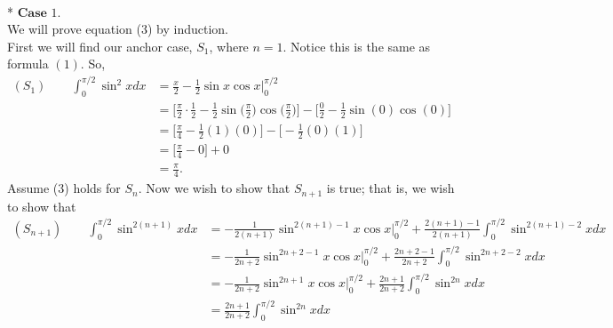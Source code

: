 \documentclass[10pt]{article}
\makeatletter
\newenvironment{question}[2][Question]{\begin{trivlist}
\item[\hskip \labelsep {\bfseries #1}\hskip \labelsep {\bfseries #2.}]}{\end{trivlist}}
\renewenvironment{proof}[1][\proofname]{\par
\pushQED{\qed}
\normalfont \topsep6\p@\@plus6\p@\relax
\trivlist
\item[\hskip\labelsep\itshape#1\@addpunct{.}]\mbox{}\\*}{\popQED\endtrivlist\@endpefalse}
\makeatother
\begin{document}
\begin{question}{2}
\begin{proof}
		\newpage \noindent
		$\textbf{Case }1.$ \\
		We will prove equation (3) by induction. \\
		First we will find our anchor case, $S_1$, where $n = 1$. Notice this is the same as formula $(1)$. So,
		\begin{align*}
			(S_1) \qquad \int^{\pi / 2}_{0} \sin^2 xdx & = \frac x 2 - \frac 1 2 \sin x \cos x \Big|^{\pi / 2}_{0}                                                                                                      \\
			                                           & = \Big[\frac \pi  2 \cdot \frac 1 2 - \frac 1 2 \sin \Big(\frac \pi 2\Big) \cos \Big(\frac \pi 2\Big)\Big] - \Big[\frac 0 2 - \frac 1 2 \sin (0) \cos (0)\Big] \\
			                                           & = \Big[\frac \pi  4 - \frac 1 2 (1) (0)\Big] - \Big[- \frac 1 2 (0)(1)\Big]                                                                                    \\
			                                           & = \Big[\frac \pi  4 - 0 \Big] + 0                                                                                                                              \\
			                                           & = \frac \pi  4.
		\end{align*}
		Assume (3) holds for $S_n$. Now we wish to show that $S_{n+1}$ is true; that is, we wish to show that
		\begin{align*}
			(S_{n + 1}) \qquad \int^{\pi / 2}_0 \sin^{2(n+1)} x dx & = - \frac 1 {2(n+1)} \sin^{{2(n+1)}-1} x \cos x \Big|^{\pi / 2}_{0}+ \frac{{2(n+1)} - 1}{{2(n+1)}} \int^{\pi / 2}_0 \sin^{{2(n+1)}-2} xdx \\
			                                                       & = - \frac 1 {2n+2} \sin^{{2n+2}-1} x \cos x \Big|^{\pi / 2}_{0}+ \frac{{2n+2} - 1}{{2n+2}} \int^{\pi / 2}_0 \sin^{{2n+2}-2} xdx           \\
			                                                       & = - \frac 1 {2n+2} \sin^{2n+1} x \cos x\Big|^{\pi / 2}_{0} + \frac{2n+1}{2n+2} \int^{\pi / 2}_0 \sin^{2n} xdx                             \\
			                                                       & = \frac{2n+1}{2n+2} \int^{\pi / 2}_0 \sin^{2n} xdx
		\end{align*}

\end{proof}
\end{question}
\end{document}
